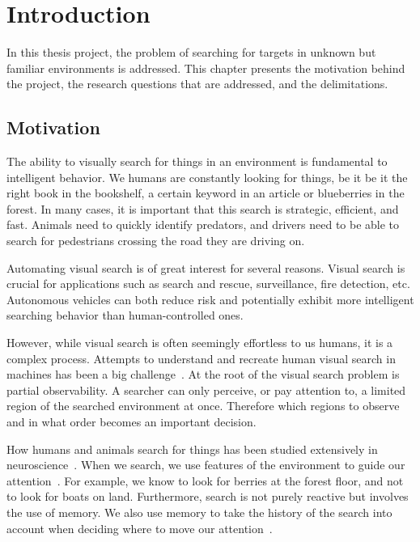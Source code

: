 
\chapter{Introduction}
\label{cha:introduction}

In this thesis project, the problem of searching for targets in unknown but familiar environments is addressed.
This chapter presents the motivation behind the project, the research questions that are addressed, and the delimitations. 

\section{Motivation}
\label{sec:motivation}


The ability to visually search for things in an environment is fundamental to intelligent behavior.
We humans are constantly looking for things, be it be it the right book in the bookshelf, a certain keyword in an article or blueberries in the forest.
In many cases, it is important that this search is strategic, efficient, and fast.
Animals need to quickly identify predators, and drivers need to be able to search for pedestrians crossing the road they are driving on.

Automating visual search is of great interest for several reasons.
Visual search is crucial for applications such as search and rescue, surveillance, fire detection, etc.
Autonomous vehicles can both reduce risk and potentially exhibit more intelligent searching behavior than human-controlled ones.

However, while visual search is often seemingly effortless to us humans, it is a complex process.
Attempts to understand and recreate human visual search in machines has been a big challenge~\cite{eckstein_visual_2011}.
At the root of the visual search problem is partial observability.
A searcher can only perceive, or pay attention to, a limited region of the searched environment at once.
Therefore which regions to observe and in what order becomes an important decision. 

How humans and animals search for things has been studied extensively in neuroscience~\cite{eckstein_visual_2011,wolfe_visual_2010,nakayama_situating_2011}.
When we search, we use features of the environment to guide our attention~\cite{wolfe_five_2017,eckstein_visual_2011}.
For example, we know to look for berries at the forest floor, and not to look for boats on land.
Furthermore, search is not purely reactive but involves the use of memory.
We also use memory to take the history of the search into account when deciding where to move our attention~\cite{wolfe_five_2017}.

